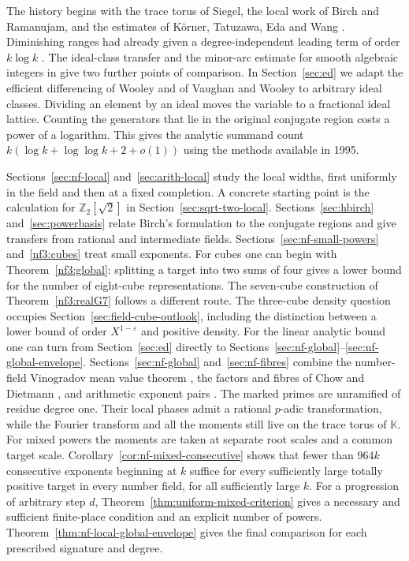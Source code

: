 \documentclass[11pt,letterpaper]{article}
\theoremstyle{definition}
\numberwithin{equation}{section}
\begin{document}
The history begins with the trace torus of Siegel, the local work of
Birch and Ramanujam, and the estimates of K\"orner, Tatuzawa, Eda
and Wang \cite{hbirch61,hram63,hkorn61,htat73,heda67,hwang}.
Diminishing ranges had already given a degree-independent leading
term of order $k\log k$ \cite{hdav98}. The ideal-class transfer and
the minor-arc estimate for smooth algebraic integers in
\cite{hdav99,hdavpenn} give two further points of comparison.
In Section~\ref{sec:ed} we adapt the efficient differencing of
Wooley and of Vaughan and Wooley \cite{edwooley,edvw} to arbitrary
ideal classes. Dividing an element by an ideal moves the variable
to a fractional ideal lattice. Counting the generators that lie in
the original conjugate region costs a power of a logarithm.
This gives the analytic summand count
$k(\log k+\log\log k+2+o(1))$ using the methods available in 1995.

Sections~\ref{sec:nf-local} and~\ref{sec:arith-local} study the
local widths, first uniformly in the field and then at a fixed
completion. A concrete starting point is the calculation for
$\mathbb Z_2[\sqrt2]$ in Section~\ref{sec:sqrt-two-local}. Sections~\ref{sec:hbirch} and~\ref{sec:powerbasis}
relate Birch's formulation to the conjugate regions and give transfers
from rational and intermediate fields. Sections~\ref{sec:nf-small-powers}
and~\ref{nf3:cubes} treat small exponents. For cubes one can begin with
Theorem~\ref{nf3:global}: splitting a target into two sums of four gives
a lower bound for the number of eight-cube representations. The
seven-cube construction of Theorem~\ref{nf3:realG7} follows a different
route. The three-cube density
question occupies Section~\ref{sec:field-cube-outlook}, including the
distinction between a lower bound of order $X^{1-\varepsilon}$ and
positive density. For the linear analytic bound one can turn from
Section~\ref{sec:ed} directly to Sections~\ref{sec:nf-global}--\ref{sec:nf-global-envelope}.
Sections~\ref{sec:nf-global}
and~\ref{sec:nf-fibres} combine the number-field Vinogradov mean
value theorem \cite{NFWooley}, the factors and fibres of Chow and
Dietmann \cite{NFChow}, and arithmetic exponent pairs
\cite{NFMili}. The marked primes are unramified of residue degree one.
Their local phases admit a rational $p$-adic transformation, while the
Fourier transform and all the moments still live on the trace torus
of $\mathbb K$. For mixed powers the moments are taken at separate root
scales and a common target scale. Corollary~\ref{cor:nf-mixed-consecutive}
shows that fewer than $964k$ consecutive exponents beginning at $k$
suffice for every sufficiently large totally positive target in every
number field, for all sufficiently large $k$. For a progression of arbitrary step $d$, Theorem~\ref{thm:uniform-mixed-criterion} gives a necessary and sufficient finite-place condition and an explicit number of powers. Theorem~\ref{thm:nf-local-global-envelope} gives the final comparison for each prescribed signature and degree.
\end{document}
